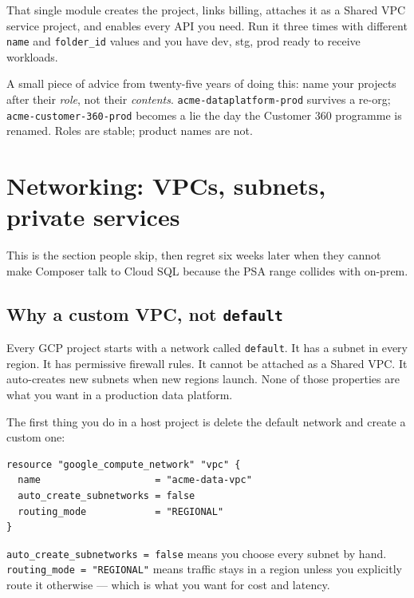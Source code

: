 \documentclass[
  11pt,
  british,
  oneside]{book}
\begin{document}
That single module creates the project, links billing, attaches it as a
Shared VPC service project, and enables every API you need. Run it three
times with different \texttt{name} and \texttt{folder\_id} values and
you have dev, stg, prod ready to receive workloads.

A small piece of advice from twenty-five years of doing this: name your
projects after their \emph{role}, not their \emph{contents}.
\texttt{acme-dataplatform-prod} survives a re-org;
\texttt{acme-customer-360-prod} becomes a lie the day the Customer 360
programme is renamed. Roles are stable; product names are not.

\hypertarget{networking-vpcs-subnets-private-services}{%
\section{Networking: VPCs, subnets, private
services}\label{networking-vpcs-subnets-private-services}}

This is the section people skip, then regret six weeks later when they
cannot make Composer talk to Cloud SQL because the PSA range collides
with on-prem.

\hypertarget{why-a-custom-vpc-not-default}{%
\subsection{\texorpdfstring{Why a custom VPC, not
\texttt{default}}{Why a custom VPC, not default}}\label{why-a-custom-vpc-not-default}}

Every GCP project starts with a network called \texttt{default}. It has
a subnet in every region. It has permissive firewall rules. It cannot be
attached as a Shared VPC. It auto-creates new subnets when new regions
launch. None of those properties are what you want in a production data
platform.

The first thing you do in a host project is delete the default network
and create a custom one:

\begin{verbatim}
resource "google_compute_network" "vpc" {
  name                    = "acme-data-vpc"
  auto_create_subnetworks = false
  routing_mode            = "REGIONAL"
}
\end{verbatim}

\texttt{auto\_create\_subnetworks\ =\ false} means you choose every
subnet by hand. \texttt{routing\_mode\ =\ "REGIONAL"} means traffic
stays in a region unless you explicitly route it otherwise --- which is
what you want for cost and latency.
\end{document}
